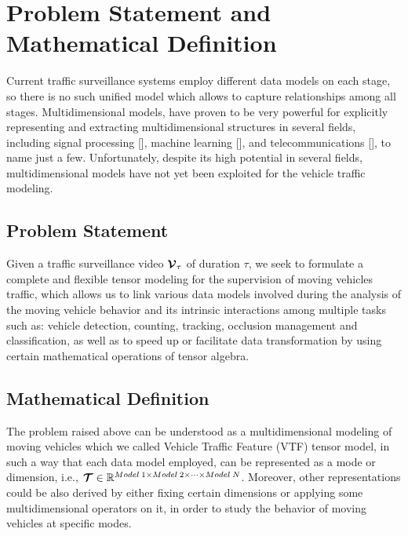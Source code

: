 \documentclass[sensors,article,submit,moreauthors,pdftex]{Definitions/mdpi}
\newcommand{\mathten}[1]{\boldsymbol{\mathbf{\mathcal{\MakeUppercase{#1}}}}}
\begin{document}
\section{Problem Statement and Mathematical Definition}

Current traffic surveillance systems employ different data models on each stage, so there is no such unified model which allows to capture relationships among all stages. Multidimensional models, have proven to be very powerful for explicitly representing and extracting multidimensional structures in several fields, including signal processing [], machine learning [],  and telecommunications [], to name just a few. Unfortunately, despite its high potential in several fields, multidimensional models have not yet been exploited for the vehicle traffic modeling.



\subsection{Problem Statement}
Given a traffic surveillance video $\mathten{V}_\tau$ of duration $\tau$, we seek to formulate a complete and flexible tensor modeling for the supervision of moving vehicles traffic, which allows us to link various data models involved during the analysis of the moving vehicle behavior and its intrinsic interactions among multiple tasks such as: vehicle detection, counting, tracking, occlusion management and classification, as well as to speed up or facilitate data transformation by using certain mathematical operations of tensor algebra.



\subsection{Mathematical Definition}
The problem raised above can be understood as a multidimensional modeling of moving vehicles which we called Vehicle Traffic Feature (VTF) tensor model, in such a way that each data model employed, can be represented as a mode or dimension, i.e., $\mathten{T} \in \mathbb{R}^{Model\:1 \times Model\:2 \times \cdots \times Model\:N}$. Moreover, other representations could be also derived by either fixing certain dimensions or applying some multidimensional operators on it, in order to study the behavior of moving vehicles at specific modes.


\end{document}
